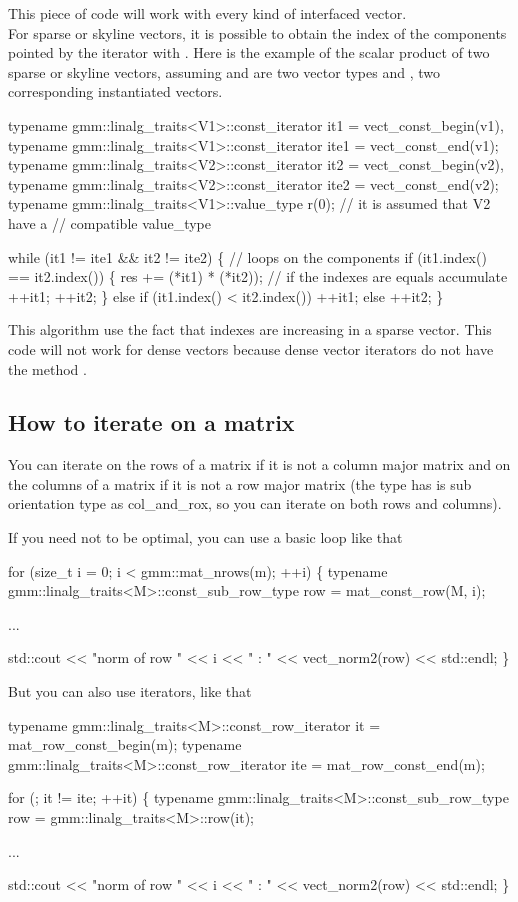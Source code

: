 \documentclass[11pt,a4paper]{article}
\begin{document}
This piece of code will work with every kind of interfaced vector.\\

For sparse or skyline vectors, it is possible to obtain the index of the components pointed by the iterator with . Here is the example of the scalar product of two sparse or skyline vectors, assuming  and  are two vector types and ,  two corresponding instantiated vectors.
\begin{cppcode}
   typename gmm::linalg_traits<V1>::const_iterator it1 = vect_const_begin(v1),
   typename gmm::linalg_traits<V1>::const_iterator ite1 = vect_const_end(v1);
   typename gmm::linalg_traits<V2>::const_iterator it2 = vect_const_begin(v2),
   typename gmm::linalg_traits<V2>::const_iterator ite2 = vect_const_end(v2);
   typename gmm::linalg_traits<V1>::value_type r(0); // it is assumed that V2 have a
                                                // compatible value_type

   while (it1 != ite1 && it2 != ite2) \{  // loops on the components
     if (it1.index() == it2.index()) \{
       res += (*it1) * (*it2));          // if the indexes are equals accumulate
       ++it1;
       ++it2;
     \}
     else if (it1.index() < it2.index())
       ++it1;
     else
       ++it2;
   \}
\end{cppcode}
This algorithm use the fact that indexes are increasing in a sparse vector. This code will not work for dense vectors because dense vector iterators do not have the method .

\subsection{How to iterate on a matrix}

You can iterate on the rows of a matrix if it is not a column major matrix and on the columns of a matrix if it is not a row major matrix (the type  has is sub orientation type as col_and_rox, so you can iterate on both rows and columns).

If you need not to be optimal, you can use a basic loop like that
\begin{cppcode}
  for (size_t i = 0; i < gmm::mat_nrows(m); ++i) \{
    typename gmm::linalg_traits<M>::const_sub_row_type row = mat_const_row(M, i);

    ...

    std::cout << "norm of row " << i << " : " << vect_norm2(row) << std::endl;
  \}
\end{cppcode}
But you can also use iterators, like that
\begin{cppcode}
  typename gmm::linalg_traits<M>::const_row_iterator it = mat_row_const_begin(m);
  typename gmm::linalg_traits<M>::const_row_iterator ite = mat_row_const_end(m);

  for (; it != ite; ++it) \{
    typename gmm::linalg_traits<M>::const_sub_row_type
      row = gmm::linalg_traits<M>::row(it);

    ...

    std::cout << "norm of row " << i << " : " << vect_norm2(row) << std::endl;
  \}
\end{cppcode}
\end{document}
